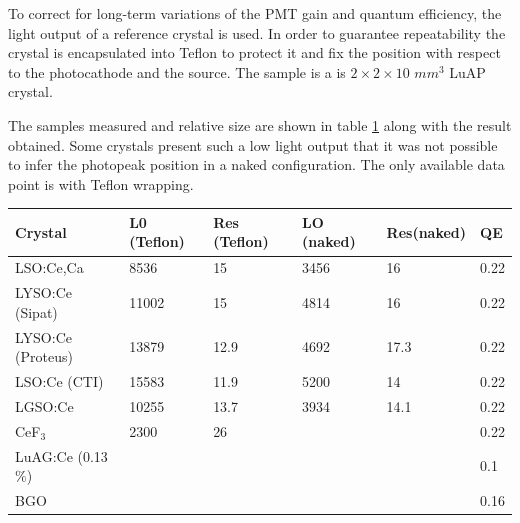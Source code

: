 To correct for long-term variations of the PMT gain and quantum efficiency, the light output of a reference crystal is used. In order to guarantee repeatability the crystal is encapsulated into Teflon to protect it and fix the position with respect to the photocathode and the source. The sample is a is $2\times 2\times 10$ $mm^{3}$ LuAP crystal.

The samples measured and relative size are shown in table \ref{table:LYtable} along with the result obtained. Some crystals present such a low light output that it was not possible to infer the photopeak position in a naked configuration. The only available data point is with Teflon wrapping.
\begin{table}[h]
\begin{center}
\begin{tabular}{|l|l|l|l|l|l|}
\hline
Crystal  & L0 (Teflon) & Res (Teflon) & LO (naked) &  Res(naked) & QE\\
\hline
LSO:Ce,Ca& 8536&15 & 3456&16 &0.22\\
\hline
LYSO:Ce (Sipat)&11002 &15 &4814 &16&0.22\\
\hline
LYSO:Ce (Proteus)& 13879& 12.9 & 4692& 17.3&0.22\\
\hline
LSO:Ce (CTI)&15583 &11.9 &5200 &14&0.22\\
\hline
LGSO:Ce & 10255&13.7 &3934 &14.1&0.22\\
\hline
CeF$_{3}$&2300&26 & & &0.22\\
\hline
LuAG:Ce (0.13$\%$)& & & & &0.1\\
\hline
BGO& & & & &0.16\\
\hline
\end{tabular}
\end{center}
\label{table:LYtable}
\end{table}

